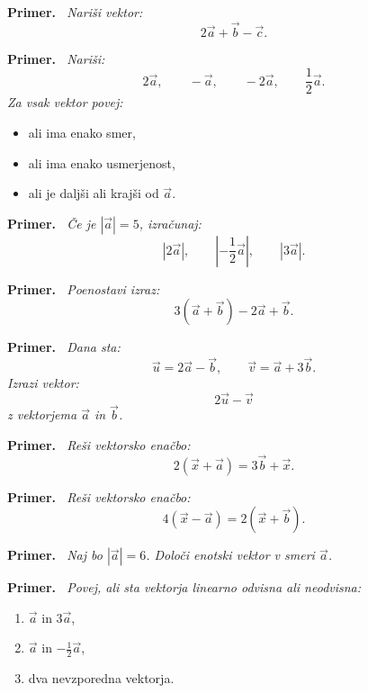 \documentclass[a4paper,11pt]{article}
\newenvironment{primer}{%
  \par\medskip\noindent\textbf{Primer.}\itshape\ }{\par\medskip}
\begin{document}
\begin{primer}
    Nariši vektor: %
    \[    2\vec{a}+\vec{b}-\vec{c}.    \]
\end{primer}
\begin{primer}
    Nariši:
    \[    2\vec{a}, \qquad -\vec{a}, \qquad -2\vec{a}, \qquad \frac12\vec{a}.    \]
    Za vsak vektor povej:
    \begin{itemize}
        \item ali ima enako smer,
        \item ali ima enako usmerjenost,
        \item ali je daljši ali krajši od $\vec{a}$.
    \end{itemize}
\end{primer}
\begin{primer}
    Če je $|\vec{a}|=5$, izračunaj:
    \[    |2\vec{a}|, \qquad    \left|-\frac12\vec{a}\right|, \qquad    |3\vec{a}|.    \]
\end{primer}
\begin{primer}
    Poenostavi izraz: %
    \[    3(\vec{a}+\vec{b})-2\vec{a}+\vec{b}.    \]
\end{primer}
\begin{primer}
    Dana sta:
    \[    \vec{u}=2\vec{a}-\vec{b}, \qquad    \vec{v}=\vec{a}+3\vec{b}.    \]
    Izrazi vektor:
    \[    2\vec{u}-\vec{v}    \]    z vektorjema $\vec{a}$ in $\vec{b}$.
\end{primer}
\begin{primer}
    Reši vektorsko enačbo:
    \[    2(\vec{x}+\vec{a})=3\vec{b}+\vec{x}.   \]
\end{primer}
\begin{primer}
    Reši vektorsko enačbo:
    \[    4(\vec{x}-\vec{a})=2(\vec{x}+\vec{b}).    \]
\end{primer}
\begin{primer}
    Naj bo $|\vec{a}|=6$. Določi enotski vektor v smeri $\vec{a}$.
\end{primer}
\begin{primer}
    Povej, ali sta vektorja linearno odvisna ali neodvisna:
    \begin{enumerate}
        \item $\vec{a}$ in $3\vec{a}$,
        \item $\vec{a}$ in $-\frac12\vec{a}$,
        \item dva nevzporedna vektorja.
    \end{enumerate}
\end{primer}
\end{document}
